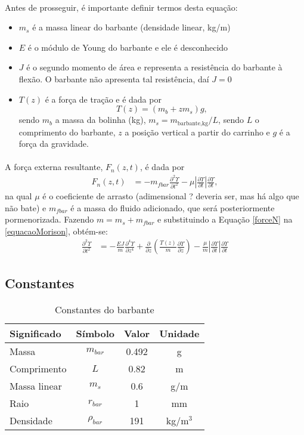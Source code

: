 \documentclass[a4paper,11pt]{scrartcl} %
\numberwithin{equation}{section} %
\numberwithin{figure}{section} %
\numberwithin{table}{section} %
\begin{document}
\paragraph{} Antes de prosseguir, é importante definir termos desta equação: \begin{itemize}
	\item $m_s$ é a massa linear do barbante (densidade linear, kg/m)
	\item $E$ é o módulo de Young do barbante e ele é desconhecido
	\item $J$ é o segundo momento de área e representa a resistência do barbante à flexão. O barbante não apresenta tal resistência, daí $J=0$
	\item $T(z)$ é a força de tração e é dada por \[T(z) = \left(m_b+z m_s\right)g,\] sendo $m_b$ a massa da bolinha (kg), $m_s = m_{\textrm{barbante,kg}}/L$, sendo $L$ o comprimento do barbante, $z$ a posição vertical a partir do carrinho e $g$ é a força da gravidade.
\end{itemize}

\paragraph{} A força externa resultante, $F_n(z,t)$, é dada por \begin{align}
	F_n(z,t) &= -m_{fbar} \frac{\partial^2 \Upsilon}{\partial t^2} - \mu \left|\frac{\partial \Upsilon}{\partial t}\right|\frac{\partial \Upsilon}{\partial t}\label{forceN},
\end{align} na qual $\mu$ é o coeficiente de arrasto (adimensional ? deveria ser, mas há algo que não bate) e $m_{fbar}$ é a massa do fluido adicionado, que será posteriormente pormenorizada. Fazendo $m = m_s + m_{fbar}$ e substituindo a Equação \ref{forceN} na \ref{equacaoMorison}, obtém-se: \begin{align}
	\frac{\partial^2 \Upsilon}{\partial t^2} &= -\frac{EJ}{m}\frac{\partial^4 \Upsilon}{\partial z^4} + \frac{\partial}{\partial z}\left(\frac{T(z)}{m}\frac{\partial \Upsilon}{\partial z}\right) - \frac{\mu}{m}\left|\frac{\partial \Upsilon}{\partial t}\right|\frac{\partial \Upsilon}{\partial t}
\end{align}

\subsection{Constantes}
\begin{table}[!ht]
	\centering
	\begin{tabular}{|l|c|c|c|}
		\hline
		\textbf{Significado} & \textbf{Símbolo} & \textbf{Valor} & \textbf{Unidade}\\ \hline \hline
		Massa & $m_{bar}$ & 0.492 & g\\ \hline
		Comprimento & $L$ & 0.82 & m \\ \hline
		Massa linear & $m_s$ & 0.6 & g/m\\ \hline
		Raio & $r_{bar}$ & 1 & mm\\ \hline
		Densidade & $\rho_{bar}$ & 191 & kg/m$^3$\\ \hline
	\end{tabular}
	\caption{Constantes do barbante}
\end{table}
\end{document}
